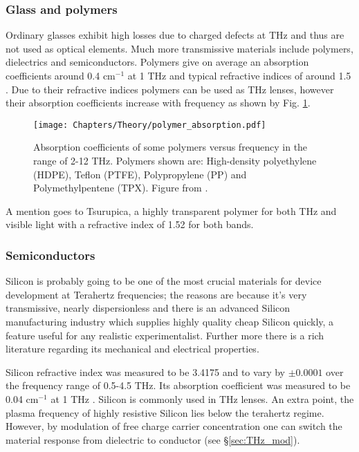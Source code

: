 \subsubsection{Glass and polymers}
Ordinary glasses exhibit high losses due to charged defects at THz and thus are not used as optical elements. Much more transmissive materials include polymers, dielectrics and semiconductors. Polymers give on average an absorption coefficients around 0.4 cm$^{-1}$ at 1 THz \cite{PrinciplesofTHz} and typical refractive indices of around 1.5 \cite{Terahertzpolymers}. Due to their refractive indices polymers can be used as THz lenses, however their absorption coefficients increase with frequency as shown by Fig. \ref{fig:polymer_absorption}.
\begin{figure}[h!]\centering
\texttt{[image: Chapters/Theory/polymer\_absorption.pdf]}
\caption{Absorption coefficients of some polymers versus frequency in the range of 2-12 THz. Polymers shown are: High-density polyethylene (HDPE), Teflon (PTFE), Polypropylene (PP) and Polymethylpentene (TPX). Figure from \cite{PrinciplesofTHz}.}
\label{fig:polymer_absorption}
\end{figure}
A mention goes to Tsurupica, a highly transparent polymer for both THz and visible light with a refractive index of 1.52 for both bands.



\subsubsection{Semiconductors}
Silicon is probably going to be one of the most crucial materials for device development at Terahertz frequencies; the reasons are because it's very transmissive, nearly dispersionless and there is an advanced Silicon manufacturing industry which supplies highly quality cheap Silicon quickly, a feature useful for any realistic experimentalist. Further more there is a rich literature regarding its mechanical and electrical properties.

Silicon refractive index was measured to be 3.4175 and to vary by $\pm 0.0001$ over the frequency range of 0.5-4.5 THz. Its absorption coefficient was measured to be 0.04 cm$^{-1}$ at 1 THz \cite{THzsilicon}. Silicon is commonly used in THz lenses. An extra point, the plasma frequency of highly resistive Silicon lies below the terahertz regime. However, by modulation of free charge carrier concentration one can switch the material response from dielectric to conductor (see \S\ref{sec:THz_mod}).

